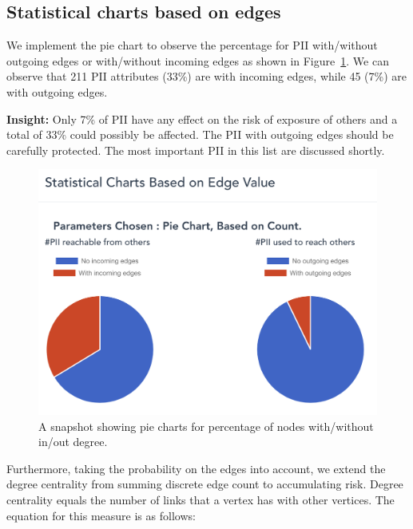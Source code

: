 \documentclass[conference]{IEEEtran}
\begin{document}
\subsection{Statistical charts based on edges}
We implement the pie chart to observe the percentage for PII with/without outgoing edges or with/without incoming edges as shown in Figure~\ref{fig:pie_pii}. We can observe that 211 PII attributes (33\%) are with incoming edges, while 45 (7\%) are with outgoing edges.

{\bf Insight:} Only 7\% of PII have any effect on the risk of exposure of others and a total of 33\% could possibly be affected. The PII with outgoing edges should be carefully protected. The most important PII in this list are discussed shortly.

\begin{figure}[ht!]
  \includegraphics[width=\linewidth]{pie_PII.png}
  \caption{A snapshot showing pie charts for percentage of nodes with/without in/out degree.}
  \label{fig:pie_pii}
\end{figure}


 Furthermore, taking the probability on the edges into account, we extend the degree centrality from summing discrete edge count to accumulating risk.
Degree centrality equals the number of links that a vertex has with other vertices. The equation for this measure is as follows: 
\end{document}

